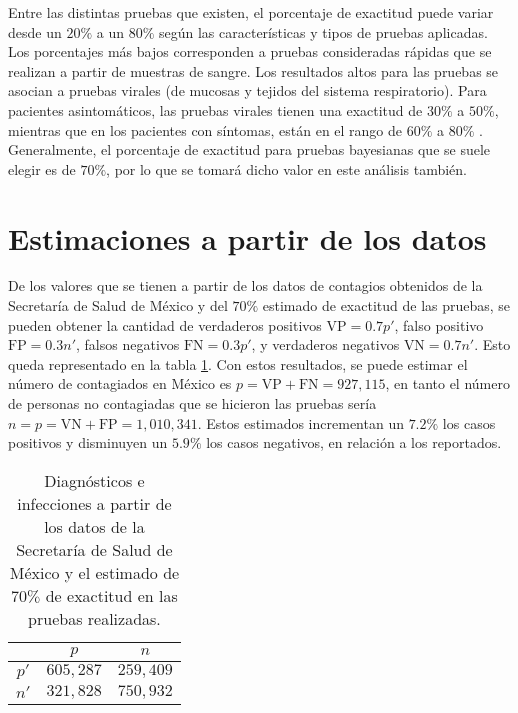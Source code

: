 \documentclass[paper=leter, fontsize=11pt]{scrartcl}
\numberwithin{equation}{section}		%
\numberwithin{figure}{section}			%
\numberwithin{table}{section}				%
\begin{document}
Entre las distintas pruebas que existen, el porcentaje de exactitud puede variar desde un $20\%$ a un $80\%$ según las características y tipos de pruebas aplicadas. Los porcentajes más bajos corresponden a pruebas consideradas rápidas que se realizan a partir de muestras de sangre. Los resultados altos para las pruebas se asocian a pruebas virales (de mucosas y tejidos del sistema respiratorio). Para pacientes asintomáticos, las pruebas virales tienen una exactitud de $30\%$ a $50\%$, mientras que en los pacientes con síntomas, están en el rango de $60\%$ a $80\%$ \citep{garcia2020, LisboaEA2516}. Generalmente, el porcentaje de exactitud para pruebas bayesianas que se suele elegir es de $70\%$, por lo que se tomará dicho valor en este análisis también.

\section{Estimaciones a partir de los datos}
De los valores que se tienen a partir de los datos de contagios obtenidos de la Secretaría de Salud de México y del $70\%$ estimado de exactitud de las pruebas, se pueden obtener la cantidad de verdaderos positivos $\text{VP} = 0.7 p'$, falso positivo $\text{FP} = 0.3 n'$, falsos negativos $\text{FN} = 0.3 p'$, y verdaderos negativos $\text{VN} = 0.7 n'$. Esto queda representado en la tabla \ref{carac}. Con estos resultados, se puede estimar el número de contagiados en México es $p = \text{VP} + \text{FN} = 927, 115$, en tanto el número de personas no contagiadas que se hicieron las pruebas sería $n = p = \text{VN} + \text{FP} = 1,010,341$. Estos estimados incrementan un $7.2\%$ los casos positivos y disminuyen un $5.9\%$ los casos negativos, en relación a los reportados.

\begin{table}[]
    \centering
    \caption{Diagnósticos e infecciones a partir de los datos de la Secretaría de Salud de México y el estimado de $70\%$ de exactitud en las pruebas realizadas.}
    \begin{tabular}{c|c|c|}
    \cline{2-3}
                               & $p$       & $n$       \\ \hline
    \multicolumn{1}{|c|}{$p'$} & $605,287$ & $259,409$  \\ \hline
    \multicolumn{1}{|c|}{$n'$} & $321,828$ & $750,932$ \\ \hline
    \end{tabular}
    \label{carac}
\end{table}
\end{document}
